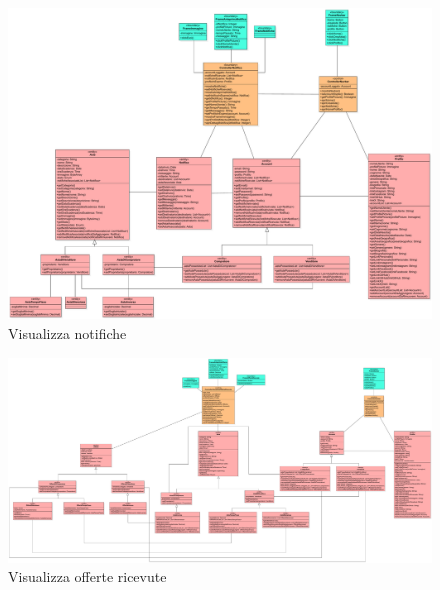             \begin{figure}[htbp!]
                \centering
                    \includegraphics[width=1\linewidth]{Immagini/Diagrammi/Class Diagram/Analisi/Utente che ha effettuato l'accesso/VisualizzaNotifiche.pdf}
                \caption{Visualizza notifiche}
            \end{figure}
            
            \begin{figure}[htbp!]
                \centering
                    \includegraphics[width=1\linewidth]{Immagini/Diagrammi/Class Diagram/Analisi/Utente che ha effettuato l'accesso/VisualizzaOfferteRicevute.pdf}
                \caption{Visualizza offerte ricevute}
            \end{figure}
            
